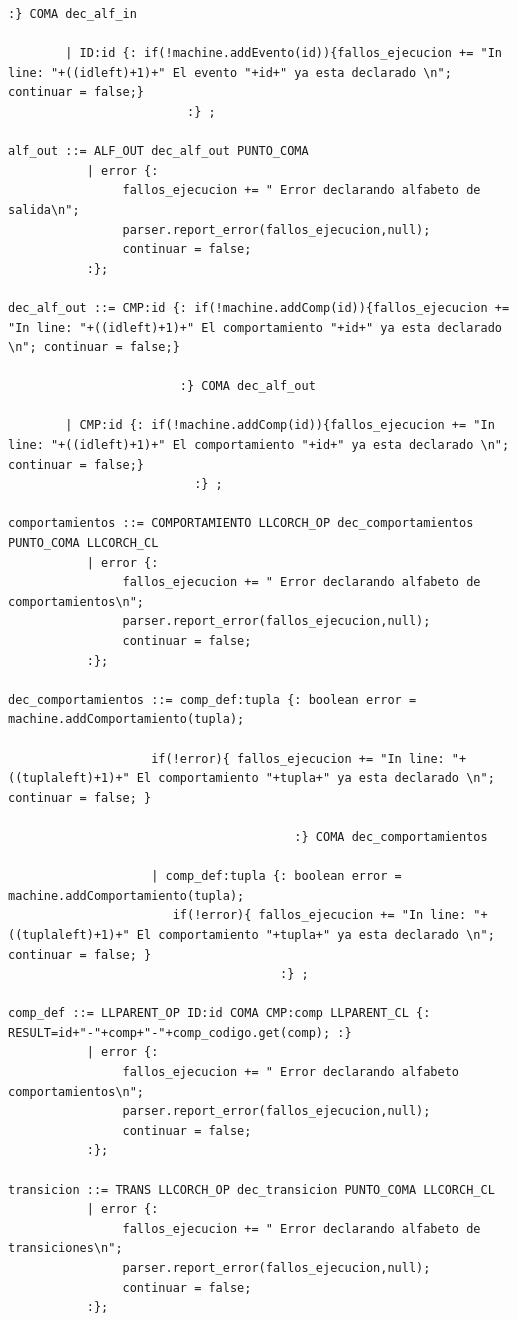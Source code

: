 \documentclass[12pt,a4paper]{article}
\begin{document}
\begin{lstlisting}[caption=Analizador Sintáctico y Semántico en CUP]
                      :} COMA dec_alf_in

		| ID:id {: if(!machine.addEvento(id)){fallos_ejecucion += "In line: "+((idleft)+1)+" El evento "+id+" ya esta declarado \n"; continuar = false;} 
                         :} ;

alf_out ::= ALF_OUT dec_alf_out PUNTO_COMA 
		   | error {:
				fallos_ejecucion += " Error declarando alfabeto de salida\n";
				parser.report_error(fallos_ejecucion,null);
				continuar = false;
		   :};

dec_alf_out ::= CMP:id {: if(!machine.addComp(id)){fallos_ejecucion += "In line: "+((idleft)+1)+" El comportamiento "+id+" ya esta declarado \n"; continuar = false;} 

                        :} COMA dec_alf_out

		| CMP:id {: if(!machine.addComp(id)){fallos_ejecucion += "In line: "+((idleft)+1)+" El comportamiento "+id+" ya esta declarado \n"; continuar = false;} 
                          :} ;

comportamientos ::= COMPORTAMIENTO LLCORCH_OP dec_comportamientos PUNTO_COMA LLCORCH_CL 
		   | error {:
				fallos_ejecucion += " Error declarando alfabeto de comportamientos\n";
				parser.report_error(fallos_ejecucion,null);
				continuar = false;
		   :};

dec_comportamientos ::= comp_def:tupla {: boolean error = machine.addComportamiento(tupla);

                    if(!error){ fallos_ejecucion += "In line: "+((tuplaleft)+1)+" El comportamiento "+tupla+" ya esta declarado \n"; continuar = false; }

                                        :} COMA dec_comportamientos 

                    | comp_def:tupla {: boolean error = machine.addComportamiento(tupla);
                       if(!error){ fallos_ejecucion += "In line: "+((tuplaleft)+1)+" El comportamiento "+tupla+" ya esta declarado \n"; continuar = false; }
                                      :} ;

comp_def ::= LLPARENT_OP ID:id COMA CMP:comp LLPARENT_CL {: RESULT=id+"-"+comp+"-"+comp_codigo.get(comp); :}
		   | error {:
				fallos_ejecucion += " Error declarando alfabeto comportamientos\n";
				parser.report_error(fallos_ejecucion,null);
				continuar = false;
		   :};

transicion ::= TRANS LLCORCH_OP dec_transicion PUNTO_COMA LLCORCH_CL 
		   | error {:
				fallos_ejecucion += " Error declarando alfabeto de transiciones\n";
				parser.report_error(fallos_ejecucion,null);
				continuar = false;
		   :};


\end{lstlisting}
\end{document}
